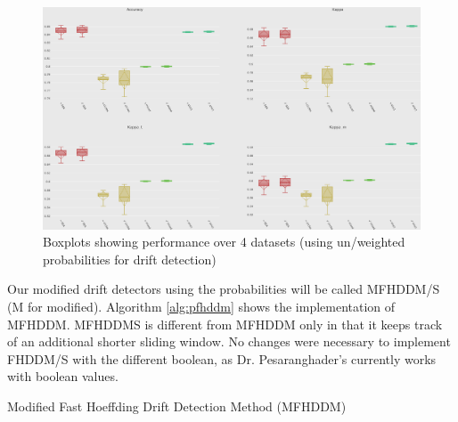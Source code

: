 \begin{figure}
  \includegraphics[width=\linewidth]{./images/chapter3/boxplot_params_use_w}
\caption{\label{fig:boxplot_params_use_w}Boxplots showing performance over 4 datasets (using un/weighted probabilities for drift detection)}
\end{figure}

Our modified drift detectors using the probabilities will be called MFHDDM/S (M for modified).
Algorithm \ref{alg:pfhddm} shows the implementation of MFHDDM. MFHDDMS is different from MFHDDM only in that it keeps track of an additional shorter sliding window. No changes were necessary to implement FHDDM/S with the different boolean, as Dr. Pesaranghader's currently works with boolean values.

\begin{algorithm}
\caption{Modified Fast Hoeffding Drift Detection Method (MFHDDM)\label{alg:pfhddm}}


\end{algorithm}

